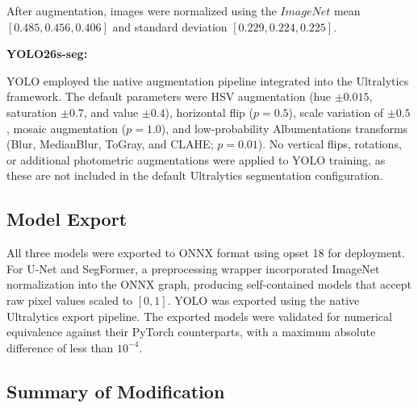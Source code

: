 \hs After augmentation, images were normalized using the $ImageNet$ mean $[0.485, 0.456, 0.406]$ and standard deviation $[0.229, 0.224, 0.225]$.

\textbf{YOLO26s-seg: }

\hs YOLO employed the native augmentation pipeline integrated into the Ultralytics framework. The default parameters were HSV augmentation (hue $\pm 0.015$, saturation $\pm 0.7$, and value $\pm 0.4$), horizontal flip ($p=0.5$), scale variation of $\pm 0.5$, mosaic augmentation ($p=1.0$), and low-probability Albumentations transforms (Blur, MedianBlur, ToGray, and CLAHE; $p=0.01$). No vertical flips, rotations, or additional photometric augmentations were applied to YOLO training, as these are not included in the default Ultralytics segmentation configuration.

\subsection{Model Export}
\label{subsec:model_export}

\hs All three models were exported to ONNX format using opset 18 for deployment. For U-Net and SegFormer, a preprocessing wrapper incorporated ImageNet normalization into the ONNX graph, producing self-contained models that accept raw pixel values scaled to $[0,1]$. YOLO was exported using the native Ultralytics export pipeline. The exported models were validated for numerical equivalence against their PyTorch counterparts, with a maximum absolute difference of less than $10^{-4}$.

\subsection{Summary of Modification}

